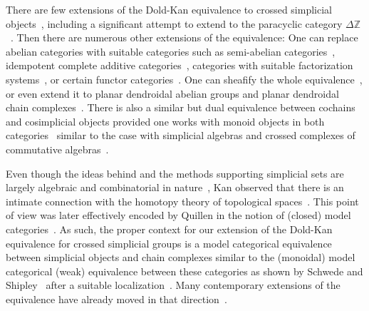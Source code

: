 \documentclass[a4paper,11pt]{amsart}
\theoremstyle{definition}
\newcommand{\B}[1]{\mathbb{#1}}
\begin{document}
There are few extensions of the Dold-Kan equivalence to crossed simplicial objects~\cite{dwyer1985normalizing,dwyer1987three,antokoletz2010nonabelian}, including a significant attempt to extend to the paracyclic category $\Delta\B{Z}$~\cite{ponge2020periodicity}. Then there are numerous other extensions of the equivalence: One can replace abelian categories with suitable categories such as semi-abelian categories~\cite{bourn-moore}, idempotent complete additive categories~\cite{lyubashenko-doldkanrevisited}, categories with suitable factorization systems~\cite{lack-street, LackStreet20}, or certain functor categories~\cite{pirashvili,slominska}. One can sheafify the whole equivalence~\cite{banarjee-nearbycycles}, or even extend it to planar dendroidal abelian groups and planar dendroidal chain complexes~\cite{gutierrez-weiss-dendroidal}.  There is also a similar but dual equivalence between cochains and cosimplicial objects provided one works with monoid objects in both categories~\cite{castiglioni-cortinas} similar to the case with simplicial algebras and crossed complexes of commutative algebras~\cite{garynantie-doldkancrossed, arvasi-kocak-simp,akca-arvasi}. 

Even though the ideas behind and the methods supporting simplicial sets are largely algebraic and combinatorial in nature~\cite{May:SimplicialObjects}, Kan observed that there is an intimate connection with the homotopy theory of topological spaces~\cite{kan1955abstract,kan1956abstract}. This point of view was later effectively encoded by Quillen in the notion of (closed) model categories~\cite{quillen1967homotopical}. As such, the proper context for our extension of the Dold-Kan equivalence for crossed simplicial groups is a model categorical equivalence between simplicial objects and chain complexes similar to the (monoidal) model categorical (weak) equivalence between these categories as shown by Schwede and Shipley~\cite{SchwedeShipley00,SchwedeShipley03} after a suitable localization~\cite{Hinich16, chorny2023variant}. Many contemporary extensions of the equivalence have already moved in that direction~\cite{richter-symmpropDold, shoikhet2011bialgebra, sore-coalgebraDold, SoreHermann17, Lurie:HigherAlgebra, dyckerhoff-categorified, peroux22, walde-homotopycoherent, peroux2023monoidal, truong2023operadic}. 
\end{document}
